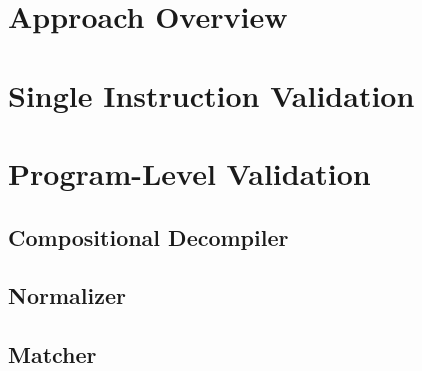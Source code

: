\section{Approach Overview}
\label{sec:Approach}



\section{Single \ISA Instruction Validation}

\section{\ISA Program-Level Validation}
\subsection{Compositional Decompiler}
\subsection{Normalizer}
\subsection{Matcher}
